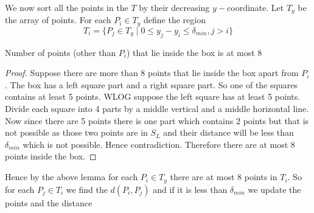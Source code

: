 We now sort all the points in the $T$ by their decreasing $y-$coordinate. Let $T_y$ be the array of points. For each $P_i\in T_y$ define the region $$T_i=\{P_j\in T_y \mid 0\leq y_j-y_i\leq \delta_{min}, j>i\}$$

\pagebreak
\begin{center}
	\begin{minipage}{0.7\textwidth}

\begin{lemma}{}{}
	Number of points (other than $P_i$) that lie inside the box is at most 8
\end{lemma}
\begin{proof}
	Suppose there are more than 8 points that lie inside the box apart from $P_i$. The box has a left square part and a right square part. So one of the squares contains at least 5 points. WLOG suppose the left square has at least 5 points. Divide each square into 4 parts by a middle vertical and a middle horizontal line. Now since there are 5 points there is one part which contains 2 points but that is not possible as those two points are in $S_L$ and their distance will be less than $\delta_{min}$ which is not possible. Hence contradiction. Therefore there are at most 8 points inside the box.
\end{proof}\parinn

Hence by the above lemma for each $P_i\in T_y$ there are at most 8 points in $T_i$. So for each $P_j\in T_i$ we find the $d(P_i,P_j)$ and if it is less than $\delta_{min}$ we update the points and the distance
	\end{minipage}
\hspace{1cm}
\begin{minipage}{0.229\textwidth}
	



\begin{tikzpicture}[x=0.75pt,y=0.75pt,yscale=-1,xscale=1]
	

\end{tikzpicture}
\end{minipage}
\end{center}
